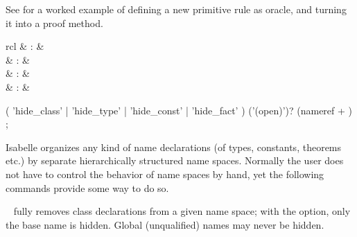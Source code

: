 \begin{isabellebody}
\begin{isamarkuptext}
  See \hyperlink{file.~~/src/FOL/ex/Iff-Oracle.thy}{\mbox{}} for a worked example of
  defining a new primitive rule as oracle, and turning it into a proof
  method.%
\end{isamarkuptext}%
\isamarkuptrue%
%
\isamarkuptrue%
%
\begin{isamarkuptext}%
\begin{matharray}{rcl}
    \hypertarget{command.hide-class}{\hyperlink{command.hide-class}{\mbox{}}} & : &  \\
    \hypertarget{command.hide-type}{\hyperlink{command.hide-type}{\mbox{}}} & : &  \\
    \hypertarget{command.hide-const}{\hyperlink{command.hide-const}{\mbox{}}} & : &  \\
    \hypertarget{command.hide-fact}{\hyperlink{command.hide-fact}{\mbox{}}} & : &  \\
  \end{matharray}

  \begin{rail}
    ( 'hide\_class' | 'hide\_type' | 'hide\_const' | 'hide\_fact' ) ('(open)')? (nameref + )
    ;
  \end{rail}

  Isabelle organizes any kind of name declarations (of types,
  constants, theorems etc.) by separate hierarchically structured name
  spaces.  Normally the user does not have to control the behavior of
  name spaces by hand, yet the following commands provide some way to
  do so.

  \begin{description}

  \item \hyperlink{command.hide-class}{\mbox{}}~ fully removes class
  declarations from a given name space; with the 
  option, only the base name is hidden.  Global (unqualified) names
  may never be hidden.


\end{description}
\end{isamarkuptext}
\end{isabellebody}
